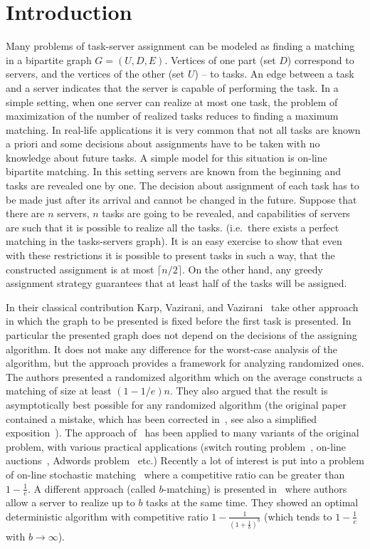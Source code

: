 \documentclass[12pt]{amsart}
\theoremstyle{definition}
\begin{document}
\section{Introduction}
Many problems of task-server assignment can be modeled as finding a matching in a bipartite graph $G=(U,D,E)$. 
Vertices of one part (set $D$) correspond to servers, and the vertices of the other (set $U$) -- to tasks. 
An edge between a task and a server indicates that the server is capable of performing the task. 
In a simple  setting, when one server can realize at most one task, the problem of maximization of the number of realized tasks reduces to finding a maximum matching.
In real-life applications it is very common that not all tasks are known a priori and some decisions about assignments have to be taken with no knowledge about future tasks. 
A simple model for this situation is on-line bipartite matching. 
In this setting servers are known from the beginning and tasks are revealed one by one. 
The decision about assignment of each task has to be made just after its arrival and cannot be changed in the future.   
Suppose that there are $n$ servers, $n$ tasks are going to be revealed, and capabilities of servers are such that it is possible to realize all the tasks.
(i.e.\ there exists a perfect matching in the tasks-servers graph). 
It is an easy exercise to show that even with these restrictions it is possible to present tasks in such a way, that the constructed assignment is at most $\lceil n/2 \rceil$. 
On the other hand, any greedy assignment strategy guarantees that at least half of the tasks will be assigned. 

In their classical contribution Karp, Vazirani, and Vazirani~\cite{KVV90} take other approach in which the graph to be presented is fixed before the first task is presented. 
In particular the presented graph does not depend on the decisions of the assigning algorithm. 
It does not make any difference for the worst-case analysis of the algorithm, but the approach provides a framework for analyzing randomized ones. 
The authors presented a randomized algorithm which on the average constructs a matching of size at least $(1-1/e)n$. 
They also argued that the result is asymptotically best possible for any randomized algorithm (the original paper~\cite{KVV90} contained a mistake, which has been corrected in~\cite{GM2008}, see also a simplified exposition~\cite{BM2008}). 
The approach of~\cite{KVV90} has been applied to many variants of the original problem, with various practical applications (switch routing problem~\cite{AC2006, AR2003}, on-line auctions~\cite{MGS2011}, Adwords problem~\cite{DH2009, GM2008, MSV2007} etc.) 
Recently a lot of interest is put into a problem of on-line stochastic matching~\cite{BK2010, FMMM2009, KMT2011, MGS2011, MP2012} where a competitive ratio can be  greater than $1-\frac{1}{e}$.
A different approach (called $b$-matching) is presented in~\cite{KalKir2000} where authors allow a server to realize up to $b$ tasks at the same time. 
They showed an optimal deterministic algorithm with  competitive ratio $1-\frac{1}{(1+\frac{1}{b})^b} $ (which tends to $1-\frac{1}{e}$ with $b \rightarrow \infty$).
\end{document}
